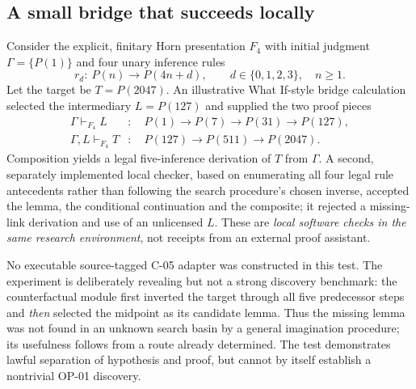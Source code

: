 \documentclass[11pt,letterpaper,oneside]{article}
\begin{document}
\subsection{A small bridge that succeeds locally}
Consider the explicit, finitary Horn presentation $F_4$ with initial judgment $\Gamma=\{P(1)\}$ and four unary inference rules
\begin{equation}\label{eq:horn-rule}
 r_d:\ P(n)\longrightarrow P(4n+d),\qquad d\in\{0,1,2,3\},\quad n\ge1.
\end{equation}
Let the target be $T=P(2047)$. An illustrative What If-style bridge calculation selected the intermediary $L=P(127)$ and supplied the two proof pieces
\begin{align*}
 \Gamma\vdash_{F_4} L &: \quad P(1)\to P(7)\to P(31)\to P(127),\\
 \Gamma,L\vdash_{F_4}T &: \quad P(127)\to P(511)\to P(2047).
\end{align*}
Composition yields a legal five-inference derivation of $T$ from $\Gamma$. A second, separately implemented local checker, based on enumerating all four legal rule antecedents rather than following the search procedure's chosen inverse, accepted the lemma, the conditional continuation and the composite; it rejected a missing-link derivation and use of an unlicensed $L$. These are \emph{local software checks in the same research environment}, not receipts from an external proof assistant.

No executable source-tagged C-05 adapter was constructed in this test. The experiment is deliberately revealing but not a strong discovery benchmark: the counterfactual module first inverted the target through all five predecessor steps and \emph{then} selected the midpoint as its candidate lemma. Thus the missing lemma was not found in an unknown search basin by a general imagination procedure; its usefulness follows from a route already determined. The test demonstrates lawful separation of hypothesis and proof, but cannot by itself establish a nontrivial OP-01 discovery.
\end{document}
